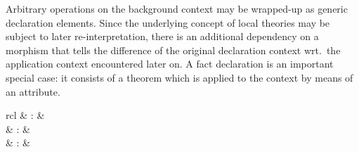 \begin{isabellebody}
\begin{isamarkuptext}
\begin{description}
  \end{description}%
\end{isamarkuptext}%
\isamarkuptrue%
%
\isamarkuptrue%
%
\begin{isamarkuptext}%
Arbitrary operations on the background context may be wrapped-up as
  generic declaration elements.  Since the underlying concept of local
  theories may be subject to later re-interpretation, there is an
  additional dependency on a morphism that tells the difference of the
  original declaration context wrt.\ the application context
  encountered later on.  A fact declaration is an important special
  case: it consists of a theorem which is applied to the context by
  means of an attribute.

  \begin{matharray}{rcl}
    \hypertarget{command.declaration}{\hyperlink{command.declaration}{\mbox{}}} & : &  \\
    \hypertarget{command.syntax-declaration}{\hyperlink{command.syntax-declaration}{\mbox{}}} & : &  \\
    \hypertarget{command.declare}{\hyperlink{command.declare}{\mbox{}}} & : &  \\
  \end{matharray}


\end{isamarkuptext}
\end{isabellebody}
